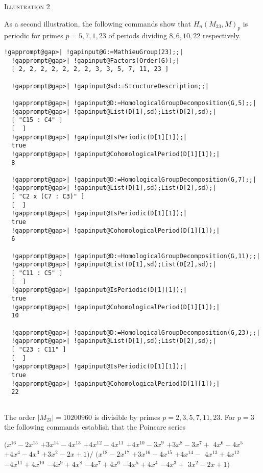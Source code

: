 \documentclass[a4paper,11pt]{report}
\begin{document}
{{\begin{Verbatim}[commandchars=!@|,fontsize=\small,frame=single,label=Example]
\end{Verbatim}
 

\textsc{Illustration 2} 

 As a second illustration, the following commands show that $H_n(M_{23},M)_{p}$ is periodic for primes $p=5, 7, 1, 23$ of periods dividing $8, 6, 10, 22$ respectively. 
\begin{Verbatim}[commandchars=!@|,fontsize=\small,frame=single,label=Example]
  !gapprompt@gap>| !gapinput@G:=MathieuGroup(23);;|
  !gapprompt@gap>| !gapinput@Factors(Order(G));|
  [ 2, 2, 2, 2, 2, 2, 2, 3, 3, 5, 7, 11, 23 ]
  
  !gapprompt@gap>| !gapinput@sd:=StructureDescription;;|
  
  !gapprompt@gap>| !gapinput@D:=HomologicalGroupDecomposition(G,5);;|
  !gapprompt@gap>| !gapinput@List(D[1],sd);List(D[2],sd);|
  [ "C15 : C4" ]
  [  ]
  !gapprompt@gap>| !gapinput@IsPeriodic(D[1][1]);|
  true
  !gapprompt@gap>| !gapinput@CohomologicalPeriod(D[1][1]);|
  8
  
  !gapprompt@gap>| !gapinput@D:=HomologicalGroupDecomposition(G,7);;|
  !gapprompt@gap>| !gapinput@List(D[1],sd);List(D[2],sd);|
  [ "C2 x (C7 : C3)" ]
  [  ]
  !gapprompt@gap>| !gapinput@IsPeriodic(D[1][1]);|
  true
  !gapprompt@gap>| !gapinput@CohomologicalPeriod(D[1][1]);|
  6
  
  !gapprompt@gap>| !gapinput@D:=HomologicalGroupDecomposition(G,11);;|
  !gapprompt@gap>| !gapinput@List(D[1],sd);List(D[2],sd);|
  [ "C11 : C5" ]
  [  ]
  !gapprompt@gap>| !gapinput@IsPeriodic(D[1][1]);|
  true
  !gapprompt@gap>| !gapinput@CohomologicalPeriod(D[1][1]);|
  10
  
  !gapprompt@gap>| !gapinput@D:=HomologicalGroupDecomposition(G,23);;|
  !gapprompt@gap>| !gapinput@List(D[1],sd);List(D[2],sd);|
  [ "C23 : C11" ]
  [  ]
  !gapprompt@gap>| !gapinput@IsPeriodic(D[1][1]);|
  true
  !gapprompt@gap>| !gapinput@CohomologicalPeriod(D[1][1]);|
  22
  
\end{Verbatim}
 

The order $|M_{23}|=10200960$ is divisible by primes $p=2, 3, 5, 7, 11, 23$. For $p=3$ the following commands establish that the Poincare series 

$(x^{16} - 2x^{15}$ $ + 3x^{14} - 4x^{13}$ $ + 4x^{12} - 4x^{11}$ $ + 4x^{10} - 3x^9$ $ + 3x^8 - 3x^7 +$ $ 4x^6 - 4x^5 $ $+ 4x^4 -4x^3$ $ + 3x^2 -2x + 1) /$ $ (x^{18} - 2x^{17}$ $ + 3x^{16} - 4x^{15}$ $ + 4x^{14} - $ $4x^{13} + 4x^{12}$ $ - 4x^{11} + 4x^{10}$ $ - 4x^9 + 4x^8$ $ - 4x^7 + 4x^6 $ $ - 4x^5 + 4x^4$ $ - 4x^3 +$ $ 3x^2 - 2x + 1)$ 

}}
\end{document}
